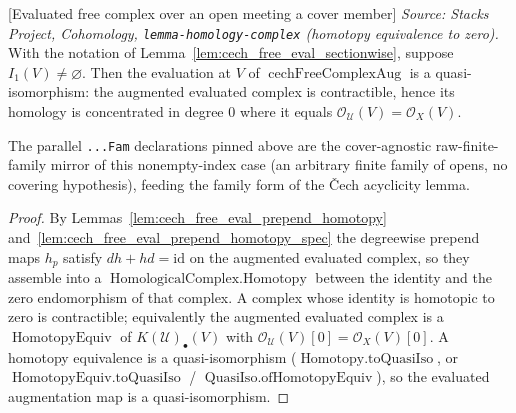 \begin{lemma}

[Evaluated free complex over an open meeting a cover member]
  \label{lem:cech_free_eval_nonempty}
  \textit{Source: Stacks Project, Cohomology, \texttt{lemma-homology-complex}
  (homotopy equivalence to zero).}
  With the notation of Lemma~\ref{lem:cech_free_eval_sectionwise}, suppose
  \(I_1(V) \neq \varnothing\). Then the evaluation at \(V\) of
  \(\operatorname{cechFreeComplexAug}\) is a quasi-isomorphism: the augmented
  evaluated complex is contractible, hence its homology is concentrated in degree
  \(0\) where it equals \(\mathcal{O}_{\mathcal{U}}(V) = \mathcal{O}_X(V)\).

  The parallel \texttt{...Fam} declarations pinned above are the cover-agnostic
  raw-finite-family mirror of this nonempty-index case (an arbitrary finite family of
  opens, no covering hypothesis), feeding the family form of the {\v C}ech
  acyclicity lemma.
\end{lemma}

\begin{proof}
  By Lemmas~\ref{lem:cech_free_eval_prepend_homotopy}
  and~\ref{lem:cech_free_eval_prepend_homotopy_spec} the degreewise prepend maps
  \(h_p\) satisfy \(dh + hd = \mathrm{id}\) on the augmented evaluated complex, so they
  assemble into a \(\operatorname{HomologicalComplex.Homotopy}\) between the identity
  and the zero endomorphism of that complex. A complex whose identity is homotopic to
  zero is contractible; equivalently the augmented evaluated complex is a
  \(\operatorname{HomotopyEquiv}\) of \(K(\mathcal{U})_\bullet(V)\) with
  \(\mathcal{O}_{\mathcal{U}}(V)[0] = \mathcal{O}_X(V)[0]\). A homotopy equivalence is a
  quasi-isomorphism (\(\operatorname{Homotopy.toQuasiIso}\), or
  \(\operatorname{HomotopyEquiv.toQuasiIso}\) /
  \(\operatorname{QuasiIso.ofHomotopyEquiv}\)), so the evaluated augmentation map is a
  quasi-isomorphism.
\end{proof}

